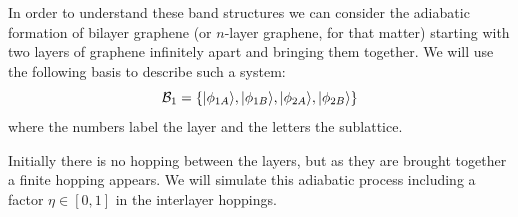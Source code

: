 In order to understand these band structures we can consider the adiabatic formation of bilayer graphene (or $n$-layer graphene, for that matter) starting with two layers of graphene infinitely apart and bringing them together.
We will use the following basis to describe such a system:
\begin{equation}
  \mathcal{B}_1 = \left\{|\phi_{1A}\rangle, |\phi_{1B}\rangle,
                        |\phi_{2A}\rangle, |\phi_{2B}\rangle\right\}
\label{basis_bi}
\end{equation}
where the numbers label the layer and the letters the sublattice.
\bigskip

Initially there is no hopping between the layers, but as they are brought together a finite hopping appears. We will simulate this adiabatic process including a factor $\eta\in[0,1]$ in the interlayer hoppings.



